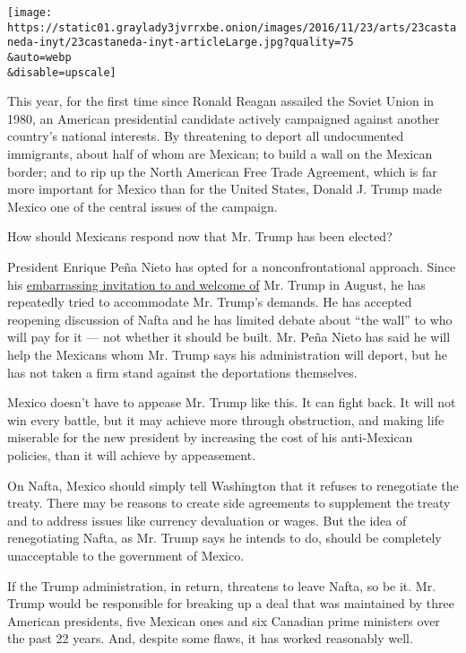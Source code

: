\texttt{[image: https://static01.graylady3jvrrxbe.onion/images/2016/11/23/arts/23castaneda-inyt/23castaneda-inyt-articleLarge.jpg?quality=75\\\&auto=webp\\\&disable=upscale]}

This year, for the first time since Ronald Reagan assailed the Soviet
Union in 1980, an American presidential candidate actively campaigned
against another country's national interests. By threatening to deport
all undocumented immigrants, about half of whom are Mexican; to build a
wall on the Mexican border; and to rip up the North American Free Trade
Agreement, which is far more important for Mexico than for the United
States, Donald J. Trump made Mexico one of the central issues of the
campaign.

How should Mexicans respond now that Mr. Trump has been elected?

President Enrique Peña Nieto has opted for a nonconfrontational
approach. Since his
\href{http://www.nytimes3xbfgragh.onion/2016/09/02/opinion/why-did-pena-nieto-invite-trump-to-mexico.html}{embarrassing
invitation to and welcome of} Mr. Trump in August, he has repeatedly
tried to accommodate Mr. Trump's demands. He has accepted reopening
discussion of Nafta and he has limited debate about ``the wall'' to who
will pay for it --- not whether it should be built. Mr. Peña Nieto has
said he will help the Mexicans whom Mr. Trump says his administration
will deport, but he has not taken a firm stand against the deportations
themselves.

Mexico doesn't have to appease Mr. Trump like this. It can fight back.
It will not win every battle, but it may achieve more through
obstruction, and making life miserable for the new president by
increasing the cost of his anti-Mexican policies, than it will achieve
by appeasement.

On Nafta, Mexico should simply tell Washington that it refuses to
renegotiate the treaty. There may be reasons to create side agreements
to supplement the treaty and to address issues like currency devaluation
or wages. But the idea of renegotiating Nafta, as Mr. Trump says he
intends to do, should be completely unacceptable to the government of
Mexico.

If the Trump administration, in return, threatens to leave Nafta, so be
it. Mr. Trump would be responsible for breaking up a deal that was
maintained by three American presidents, five Mexican ones and six
Canadian prime ministers over the past 22 years. And, despite some
flaws, it has worked reasonably well.

